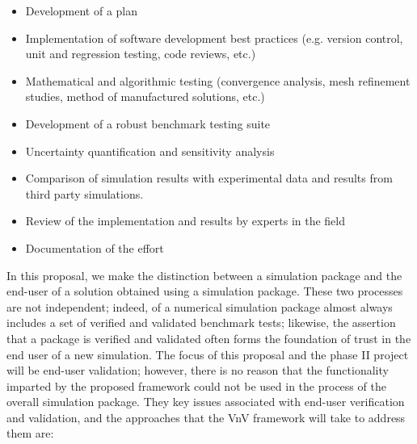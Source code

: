 \begin{itemize}
 \item Development of a \VV plan
 \item Implementation of software development best practices (e.g. version control, unit and regression testing, code reviews, etc.)
 \item Mathematical and algorithmic testing (convergence analysis, mesh refinement studies, method of manufactured solutions, etc.)
 \item Development of a robust benchmark testing suite
 \item Uncertainty quantification and sensitivity analysis
 \item Comparison of simulation results with experimental data and results from third party simulations. 
 \item Review of the implementation and results by experts in the field
 \item Documentation of the \VV effort
\end{itemize}

In this proposal, we make the distinction between \VV a simulation package and the end-user \VV of a solution obtained using a simulation package. These two processes are not independent; indeed, \VV of a numerical simulation 
package almost always includes a set of verified and validated benchmark tests; likewise, the assertion that a package is verified and validated often forms the foundation of trust in the end user \VV of a new simulation. The focus of this proposal and the phase II project will be end-user validation; however, there is no reason that the functionality imparted by the proposed framework could not be used in the \VV process of the overall simulation package. They key issues associated with end-user verification and validation, and the approaches that the VnV framework will take to address them are:

